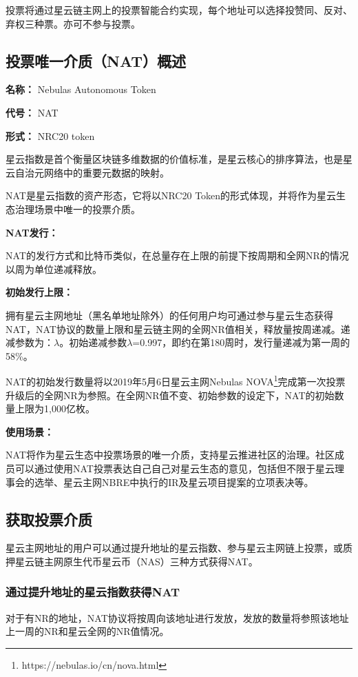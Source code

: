 投票将通过星云链主网上的投票智能合约实现，每个地址可以选择投赞同、反对、弃权三种票。亦可不参与投票。

\subsection{投票唯一介质（NAT）概述}

\textbf{名称：} Nebulas Autonomous Token

\textbf{代号：} NAT

\textbf{形式：} NRC20 token

星云指数是首个衡量区块链多维数据的价值标准，是星云核心的排序算法，也是星云自治元网络中的重要元数据的映射。
	
NAT是星云指数的资产形态，它将以NRC20 Token的形式体现，并将作为星云生态治理场景中唯一的投票介质。

\textbf{NAT发行：}
	
NAT的发行方式和比特币类似，在总量存在上限的前提下按周期和全网NR的情况以周为单位递减释放。

\textbf{初始发行上限：}

拥有星云主网地址（黑名单地址除外）的任何用户均可通过参与星云生态获得NAT，NAT协议的数量上限和星云链主网的全网NR值相关，释放量按周递减。递减参数为：$\lambda$。初始递减参数$\lambda$=0.997，即约在第180周时，发行量递减为第一周的58\%。

NAT的初始发行数量将以2019年5月6日星云主网Nebulas NOVA\footnote{https://nebulas.io/cn/nova.html}完成第一次投票升级后的全网NR为参照。在全网NR值不变、初始参数的设定下，NAT的初始数量上限为1,000亿枚。

\textbf{使用场景：}

NAT将作为星云生态中投票场景的唯一介质，支持星云推进社区的治理。社区成员可以通过使用NAT投票表达自己自己对星云生态的意见，包括但不限于星云理事会的选举、星云主网NBRE中执行的IR及星云项目提案的立项表决等。


\subsection{获取投票介质}

星云主网地址的用户可以通过提升地址的星云指数、参与星云主网链上投票，或质押星云链主网原生代币星云币（NAS）三种方式获得NAT。


\subsubsection{通过提升地址的星云指数获得NAT}

对于有NR的地址，NAT协议将按周向该地址进行发放，发放的数量将参照该地址上一周的NR和星云全网的NR值情况。

